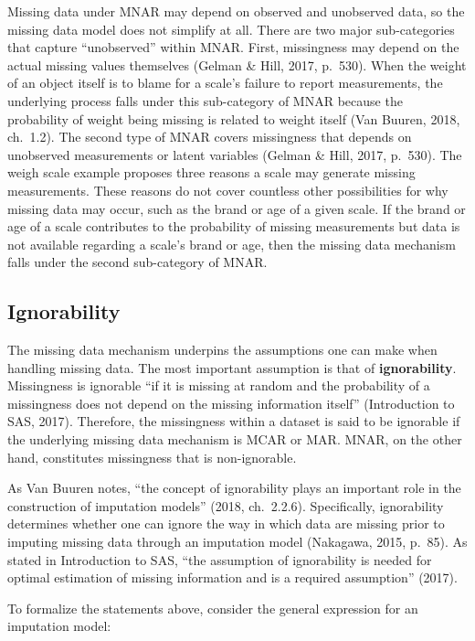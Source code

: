 \documentclass[12pt,oneside]{chicagocapstone}
\begin{document}
Missing data under MNAR may depend on observed and unobserved data, so
the missing data model does not simplify at all. There are two major
sub-categories that capture ``unobserved'' within MNAR. First,
missingness may depend on the actual missing values themselves (Gelman
\& Hill, 2017, p.~530). When the weight of an object itself is to blame
for a scale's failure to report measurements, the underlying process
falls under this sub-category of MNAR because the probability of weight
being missing is related to weight itself (Van Buuren, 2018, ch.~1.2).
The second type of MNAR covers missingness that depends on unobserved
measurements or latent variables (Gelman \& Hill, 2017, p.~530). The
weigh scale example proposes three reasons a scale may generate missing
measurements. These reasons do not cover countless other possibilities
for why missing data may occur, such as the brand or age of a given
scale. If the brand or age of a scale contributes to the probability of
missing measurements but data is not available regarding a scale's brand
or age, then the missing data mechanism falls under the second
sub-category of MNAR.

\subsection*{Ignorability}\label{background-ignorability}

The missing data mechanism underpins the assumptions one can make when
handling missing data. The most important assumption is that of
\textbf{ignorability}. Missingness is ignorable ``if it is missing at
random and the probability of a missingness does not depend on the
missing information itself'' (Introduction to SAS, 2017). Therefore, the
missingness within a dataset is said to be ignorable if the underlying
missing data mechanism is MCAR or MAR. MNAR, on the other hand,
constitutes missingness that is non-ignorable.

As Van Buuren notes, ``the concept of ignorability plays an important
role in the construction of imputation models'' (2018, ch.~2.2.6).
Specifically, ignorability determines whether one can ignore the way in
which data are missing prior to imputing missing data through an
imputation model (Nakagawa, 2015, p.~85). As stated in Introduction to
SAS, ``the assumption of ignorability is needed for optimal estimation
of missing information and is a required assumption'' (2017).

To formalize the statements above, consider the general expression for
an imputation model:
\end{document}
